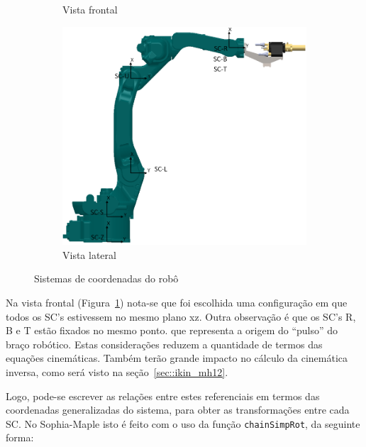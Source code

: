 \begin{figure}[h]
\begin{subfigure}[b]{0.20\textwidth}
        \caption{Vista frontal}
        \label{fig::sc_front}
    \end{subfigure}
    \quad %
    \begin{subfigure}[b]{0.7\textwidth}
        \includegraphics[width=\textwidth]{figs/sc_lat}
        \caption{Vista lateral}
        \label{fig::sc_lat}
    \end{subfigure}
    \caption{Sistemas de coordenadas do robô}\label{fig::scs}
\end{figure}

Na vista frontal (Figura~\ref{fig::sc_front}) nota-se que foi escolhida uma
configuração em que todos os SC's estivessem no mesmo plano xz. Outra observação
é que os SC's R, B e T estão fixados no mesmo ponto. que representa a origem do
``pulso'' do braço robótico. Estas considerações reduzem a quantidade de termos
das equações cinemáticas. Também terão grande impacto no cálculo da cinemática
inversa, como será visto na seção~\ref{sec::ikin_mh12}.

Logo, pode-se escrever as relações entre estes referenciais em termos das
coordenadas generalizadas do sistema, para obter as transformações entre cada
SC. No Sophia-Maple isto é feito com o uso da função \texttt{chainSimpRot}, da
seguinte forma:

\bigskip {} \bigskip 

